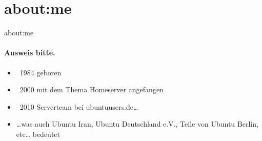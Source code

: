 \section{about:me}

\begin{frame}{about:me}
\framesubtitle{Ausweis bitte.}
\begin{itemize}
\item ~1984 geboren
\pause
\item ~2000 mit dem Thema Homeserver angefangen
\pause
\item ~2010 Serverteam bei ubuntuusers.de…
\pause
\item …was auch Ubuntu Iran, Ubuntu Deutschland e.V., Teile von Ubuntu Berlin, etc… bedeutet
\end{itemize}
\end{frame}
